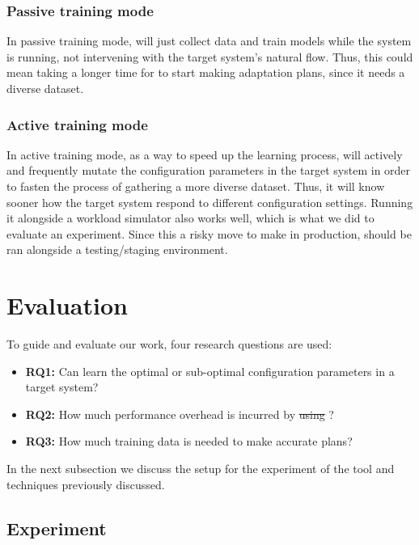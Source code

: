 \subsubsection{Passive training mode}

In passive training mode, \projectname{} will just collect data and train models while the system is running, not intervening with the target system's natural flow. Thus, this could mean taking a longer time for \projectname{} to start making adaptation plans, since it needs a diverse dataset.

\subsubsection{Active training mode}

In active training mode, as a way to speed up the learning process, \projectname{} will actively and frequently mutate the configuration parameters in the target system in order to fasten the process of gathering a more diverse dataset. Thus, it will know sooner how the target system respond to different configuration settings. Running it alongside a workload simulator also works well, which is what we did to evaluate an experiment. Since this a risky move to make in production, \projectname{} should be ran alongside a testing/staging environment.


\section{Evaluation}

To guide and evaluate our work, four research questions are used:

\begin{itemize}
  \item \textbf{RQ1:} Can \projectname{} learn the optimal or sub-optimal configuration parameters in a target system?
  \item \textbf{RQ2:} How much performance overhead is incurred by \st{using} \projectname{}?
  \item \textbf{RQ3:} How much training data is needed to make accurate plans?
\end{itemize}

In the next subsection we discuss the setup for the experiment of the tool and techniques previously discussed.

\subsection{Experiment}

